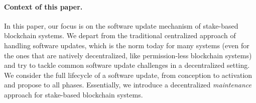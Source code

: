 \paragraph{Context of this paper.} 
In this paper, our focus is on the software update mechanism of stake-based blockchain systems. We depart from the traditional centralized approach of handling software updates, which is the norm today for many systems (even for the ones that are natively decentralized, like permission-less blockchain systems) and try to tackle common software update challenges in a decentralized setting. We consider the full lifecycle of a software update, from conception to activation and propose  to all phases. Essentially, we introduce a decentralized \emph{maintenance} approach for stake-based blockchain systems.



